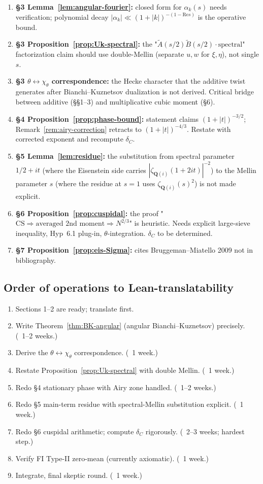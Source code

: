 \documentclass[11pt]{article}
\theoremstyle{definition}
\newcommand{\Q}{\mathbf{Q}}
\newcommand{\Qi}{\Q(i)}
\renewcommand{\Re}{\mathrm{Re}}
\begin{document}
\begin{enumerate}
\item \textbf{§3 Lemma~\ref{lem:angular-fourier}:} closed form for $\alpha_k(s)$ needs verification; polynomial decay $|\alpha_k|\ll(1+|k|)^{-(1-\Re s)}$ is the operative bound.
\item \textbf{§3 Proposition~\ref{prop:Uk-spectral}:} the "$\widetilde A(s/2)\widetilde B(s/2)\cdot\text{spectral}$" factorization claim should use double-Mellin (separate $u,w$ for $\xi,\eta$), not single $s$.
\item \textbf{§3 $\theta\leftrightarrow\chi_\theta$ correspondence:} the Hecke character that the additive twist generates after Bianchi--Kuznetsov dualization is not derived. Critical bridge between additive (§§1--3) and multiplicative cubic moment (§6).
\item \textbf{§4 Proposition~\ref{prop:phase-bound}:} statement claims $(1+|t|)^{-3/2}$; Remark~\ref{rem:airy-correction} retracts to $(1+|t|)^{-4/3}$. Restate with corrected exponent and recompute $\delta_C$.
\item \textbf{§5 Lemma~\ref{lem:residue}:} the substitution from spectral parameter $1/2+it$ (where the Eisenstein side carries $|\zeta_{\Qi}(1+2it)|^{-2}$) to the Mellin parameter $s$ (where the residue at $s=1$ uses $\zeta_{\Qi}(s)^2$) is not made explicit.
\item \textbf{§6 Proposition~\ref{prop:cuspidal}:} the proof "$\text{CS}\Rightarrow\text{averaged 2nd moment}\Rightarrow N^{2/3}$" is heuristic. Needs explicit large-sieve inequality, Hyp~6.1 plug-in, $\theta$-integration. $\delta_C$ to be determined.
\item \textbf{§7 Proposition~\ref{prop:eis-Sigma}:} cites Bruggeman--Miatello 2009 not in bibliography.
\end{enumerate}

\subsection*{Order of operations to Lean-translatability}

\begin{enumerate}
\item Sections 1--2 are ready; translate first.
\item Write Theorem~\ref{thm:BK-angular} (angular Bianchi--Kuznetsov) precisely. (~1--2 weeks.)
\item Derive the $\theta\leftrightarrow\chi_\theta$ correspondence. (~1 week.)
\item Restate Proposition~\ref{prop:Uk-spectral} with double Mellin. (~1 week.)
\item Redo §4 stationary phase with Airy zone handled. (~1--2 weeks.)
\item Redo §5 main-term residue with spectral-Mellin substitution explicit. (~1 week.)
\item Redo §6 cuspidal arithmetic; compute $\delta_C$ rigorously. (~2--3 weeks; hardest step.)
\item Verify FI Type-II zero-mean (currently axiomatic). (~1 week.)
\item Integrate, final skeptic round. (~1 week.)
\end{enumerate}
\end{document}
